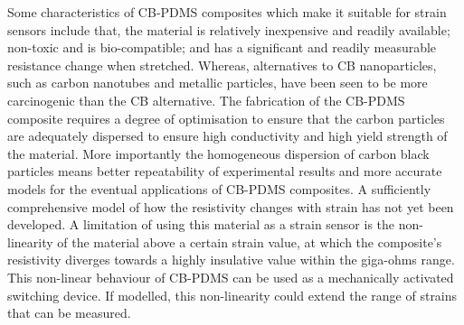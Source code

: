 Some characteristics of CB-PDMS composites which make it suitable for strain sensors include that, the material is relatively inexpensive and readily available; non-toxic and is bio-compatible; and has a significant and readily measurable resistance change when stretched. Whereas, alternatives to CB nanoparticles, such as carbon nanotubes\cite{Maddipatla2017,Wang2013} and metallic particles\cite{Quinsaat2015,Racles2021}, have been seen to be more carcinogenic than the CB alternative\cite{Fukushima2018,Ferdous2020,Rausch2004}. The fabrication of the CB-PDMS composite requires a degree of optimisation to ensure that the carbon particles are adequately dispersed to ensure high conductivity and high yield strength of the material. More importantly the homogeneous dispersion of carbon black particles means better repeatability of experimental results and more accurate models for the eventual applications of CB-PDMS composites. A sufficiently comprehensive model of how the resistivity changes with strain has not yet been developed. A limitation of using this material as a strain sensor is the non-linearity of the material above a certain strain value, at which the composite's resistivity diverges towards a highly insulative value within the giga-ohms range. This non-linear behaviour of CB-PDMS can be used as a mechanically activated switching device\cite{Henke2018}. If modelled, this non-linearity could extend the range of strains that can be measured.

